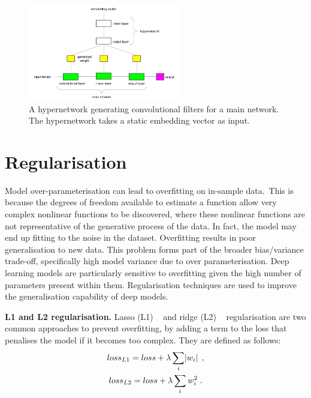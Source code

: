 \begin{figure}
   	\centering
    	\includegraphics[width=0.6\textwidth, height=0.4\textwidth]{hypernetwork.png}
	\captionsetup{justification=centering}
	\caption{A hypernetwork generating convolutional filters for a main network. The hypernetwork takes a static embedding vector as input.}
\end{figure}



\section{Regularisation}

Model over-parameterisation can lead to overfitting on in-sample data.\ This is because the degrees of freedom available to estimate a function allow very complex nonlinear functions to be discovered, where these nonlinear functions are not representative of the generative process of the data. In fact, the model may end up fitting to the noise in the dataset. Overfitting results in poor generalisation to new data. This problem forms part of the broader bias/variance trade-off, specifically high model variance due to over parameterisation. Deep learning models are particularly sensitive to overfitting given the high number of parameters present within them. Regularisation techniques are used to improve the generalisation capability of deep models. \par

\noindent \textbf{L1 and L2 regularisation.} Lasso (L1) \unskip ~\citep{tibshirani1996regression} and ridge (L2) \unskip ~\citep{hoerl1970ridge} regularisation are two common approaches to prevent overfitting, by adding a term to the loss that penalises the model if it becomes too complex. They are defined as follows:
\begin{subequations}
	\begin{gather}
		loss_{L1} = loss + \lambda\sum_i\abs{w_i} \; ,  \\
		loss_{L2} = loss + \lambda\sum_iw_i^2 \; .
	\end{gather}
\end{subequations}

